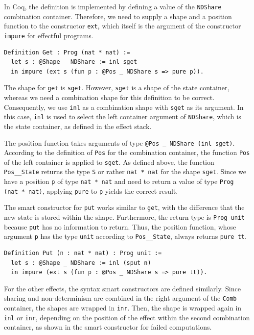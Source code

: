 \documentclass[a4paper, 11pt, fleqn, twoside, abstract=on]{scrreprt}
\newcommand{\hinl}[1]{\texttt{#1}}
\newcommand{\cinl}[1]{\texttt{#1}}
\begin{document}
In Coq, the definition is implemented by defining a value of the \cinl{NDShare} combination container.
Therefore, we need to supply a shape and a position function to the constructor \cinl{ext}, which itself is the argument of  the constructor \cinl{impure} for effectful programs.

\begin{verbatim}
Definition Get : Prog (nat * nat) :=
  let s : @Shape _ NDShare := inl sget
  in impure (ext s (fun p : @Pos _ NDShare s => pure p)).
\end{verbatim}
\noindent
The shape for \hinl{get} is \cinl{sget}.
However, \cinl{sget} is a shape of the state container, whereas we need a combination shape for this definition to be correct.
Consequently, we use \cinl{inl} as a combination shape with \cinl{sget} as its argument.
In this case, \cinl{inl} is used to select the left container argument of \cinl{NDShare}, which is the state container, as defined in the effect stack.

The position function takes arguments of type \cinl{@Pos _ NDShare (inl sget)}.
According to the definition of \cinl{Pos} for the combination container, the function \cinl{Pos} of the left container is applied to \cinl{sget}.
As defined above, the function \cinl{Pos__State} returns the type \cinl{S} or rather \cinl{nat * nat} for the shape \cinl{sget}.
Since we have a position \cinl{p} of type \cinl{nat * nat} and need to return a value of type \cinl{Prog (nat * nat)}, applying \cinl{pure} to \cinl{p} yields the correct result.

The smart constructor for \hinl{put} works similar to \hinl{get}, with the difference that the new state is stored within the shape.
Furthermore, the return type is \cinl{Prog unit} because \hinl{put} has no information to return.
Thus, the position function, whose argument \cinl{p} has the type \cinl{unit} according to \cinl{Pos__State}, always returns \cinl{pure tt}.

\begin{verbatim}
Definition Put (n : nat * nat) : Prog unit :=
  let s : @Shape _ NDShare := inl (sput n)
  in impure (ext s (fun p : @Pos _ NDShare s => pure tt)).
\end{verbatim}

For the other effects, the syntax smart constructors are defined similarly.
Since sharing and non-determinism are combined in the right argument of the \cinl{Comb} container, the shapes are wrapped in \cinl{inr}.
Then, the shape is wrapped again in \cinl{inl} or \cinl{inr}, depending on the position of the effect within the second combination container, as shown in the smart constructor for failed computations.
\end{document}
